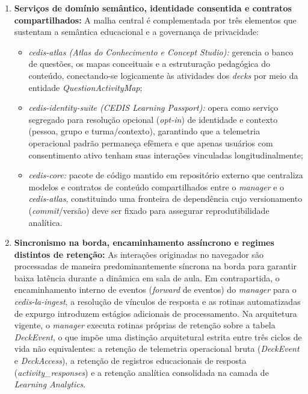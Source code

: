 \begin{enumerate}
    \item \textbf{Serviços de domínio semântico, identidade consentida e contratos compartilhados:} A malha central é complementada por três elementos que sustentam a semântica educacional e a governança de privacidade:
    \begin{itemize}
        \item \textit{cedis-atlas (Atlas do Conhecimento e Concept Studio):} gerencia o banco de questões, os mapas conceituais e a estruturação pedagógica do conteúdo, conectando-se logicamente às atividades dos \textit{decks} por meio da entidade \textit{QuestionActivityMap};
        \item \textit{cedis-identity-suite (CEDIS Learning Passport):} opera como serviço segregado para resolução opcional (\textit{opt-in}) de identidade e contexto (pessoa, grupo e turma/contexto), garantindo que a telemetria operacional padrão permaneça efêmera e que apenas usuários com consentimento ativo tenham suas interações vinculadas longitudinalmente;
        \item \textit{cedis-core:} pacote de código mantido em repositório externo que centraliza modelos e contratos de conteúdo compartilhados entre o \textit{manager} e o \textit{cedis-atlas}, constituindo uma fronteira de dependência cujo versionamento (\textit{commit}/versão) deve ser fixado para assegurar reprodutibilidade analítica.
    \end{itemize}

    \item \textbf{Sincronismo na borda, encaminhamento assíncrono e regimes distintos de retenção:} As interações originadas no navegador são processadas de maneira predominantemente síncrona na borda para garantir baixa latência durante a dinâmica em sala de aula. Em contrapartida, o encaminhamento interno de eventos (\textit{forward} de eventos) do \textit{manager} para o \textit{cedis-la-ingest}, a resolução de vínculos de resposta e as rotinas automatizadas de expurgo introduzem estágios adicionais de processamento. Na arquitetura vigente, o \textit{manager} executa rotinas próprias de retenção sobre a tabela \textit{DeckEvent}, o que impõe uma distinção arquitetural estrita entre três ciclos de vida não equivalentes: a retenção de telemetria operacional bruta (\textit{DeckEvent} e \textit{DeckAccess}), a retenção de registros educacionais de resposta (\textit{activity\_responses}) e a retenção analítica consolidada na camada de \textit{Learning Analytics}.
\end{enumerate}


